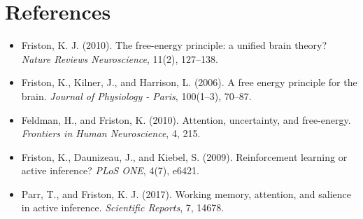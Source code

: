 \documentclass[a4paper,11pt]{article}
\begin{document}
    
    \section{References}
        \begin{itemize}[leftmargin=1.8em]
	\item Friston, K. J. (2010). The free-energy principle: a unified brain theory? \textit{Nature Reviews Neuroscience}, 11(2), 127--138.
    \item Friston, K., Kilner, J., and Harrison, L. (2006). A free energy principle for the brain. \textit{Journal of Physiology - Paris}, 100(1--3), 70--87.
    \item Feldman, H., and Friston, K. (2010). Attention, uncertainty, and free-energy. \textit{Frontiers in Human Neuroscience}, 4, 215.
    \item Friston, K., Daunizeau, J., and Kiebel, S. (2009). Reinforcement learning or active inference? \textit{PLoS ONE}, 4(7), e6421.
    \item Parr, T., and Friston, K. J. (2017). Working memory, attention, and salience in active inference. \textit{Scientific Reports}, 7, 14678.
        \end{itemize}
\end{document}
